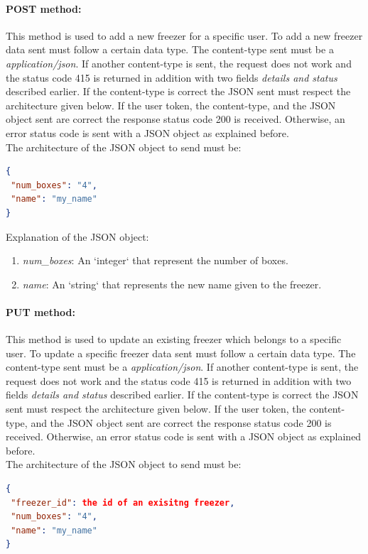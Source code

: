 \paragraph{POST method:} This method is used to add a new freezer for a specific user. To add a new freezer data sent must follow a certain data type. The content-type sent must be a \textit{application/json}. If another content-type is sent, the request does not work and the status code 415 is returned in addition with two fields \textit{details and status} described earlier. If the  content-type is correct the JSON sent must respect the architecture given below. If the user token, the  content-type, and the JSON object sent are correct the response status code 200 is received. Otherwise, an error status code is sent with a JSON object as explained before.\\

The architecture of the JSON object to send must be:
\begin{lstlisting}[language=json]
{
 "num_boxes": "4",
 "name": "my_name"
}
\end{lstlisting}

Explanation of the  JSON object:
\begin{enumerate}
\item \textit{num\_boxes}: An `integer` that represent the number of boxes.
\item \textit{name}: An `string` that represents the new name given to the freezer.
\end{enumerate}

\paragraph{PUT method:} This method is used to update an existing freezer which belongs to a specific user. To update a specific freezer data sent must follow a certain data type. The content-type sent must be a \textit{application/json}. If another content-type is sent, the request does not work and the status code 415 is returned in addition with two fields \textit{details and status} described earlier. If the  content-type is correct the JSON sent must respect the architecture given below. If the user token, the  content-type, and the JSON object sent are correct the response status code 200 is received. Otherwise, an error status code is sent with a JSON object as explained before.\\

The architecture of the JSON object to send must be:
\begin{lstlisting}[language=json]
{
 "freezer_id": the id of an exisitng freezer,
 "num_boxes": "4",
 "name": "my_name"
}
\end{lstlisting}

